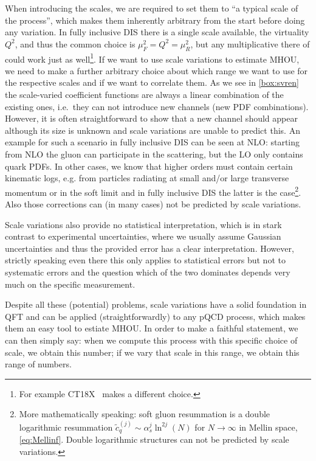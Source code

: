 When introducing the scales, we are required to set them to \enquote{a typical scale of the process}, which makes them inherently arbitrary from the start before doing any variation.
In fully inclusive DIS there is a single scale available, the virtuality $Q^2$, and thus the common choice is $\mu_F^2 = Q^2 = \mu_R^2$, but any multiplicative there of could work just as well\footnote{For example CT18X~\cite{Hou:2019efy} makes a different choice.}.
If we want to use scale variations to estimate MHOU, we need to make a further arbitrary choice about which range we want to use for the respective scales and if we want to correlate them.
As we see in \cref{box:svren} the scale-varied coefficient functions are always a linear combination of the existing ones, i.e.\ they can not introduce new channels (new PDF combinations).
However, it is often straightforward to show that a new channel should appear although its size is unknown and scale variations are unable to predict this.
An example for such a scenario in fully inclusive DIS can be seen at NLO: starting from NLO the gluon can participate in the scattering, but the LO only contains quark PDFs.
In other cases, we know that higher orders must contain certain kinematic logs, e.g. from particles radiating at small and/or large transverse momentum or in the soft limit and in fully inclusive DIS the latter is the case\footnote{More mathematically speaking: soft gluon resummation is a double logarithmic resummation $\tilde c_q^{(j)} \sim \alpha_s^j \ln^{2j}(N)$ for $N\to\infty$ in Mellin space, \cref{eq:Mellinf}. Double logarithmic structures can not be predicted by scale variations.}.
Also those corrections can (in many cases) not be predicted by scale variations.

Scale variations also provide no statistical interpretation, which is in stark contrast to experimental uncertainties, where we usually assume Gaussian uncertainties and thus the provided error has a clear interpretation.
However, strictly speaking even there this only applies to statistical errors but not to systematic errors and the question which of the two dominates depends very much on the specific measurement.

Despite all these (potential) problems, scale variations have a solid foundation in QFT and can be applied (straightforwardly) to any pQCD process, which makes them an easy tool to estiate MHOU.
In order to make a faithful statement, we can then simply say: when we compute this process with this specific choice of scale, we obtain this number; if we vary that scale in this range, we obtain this range of numbers.

